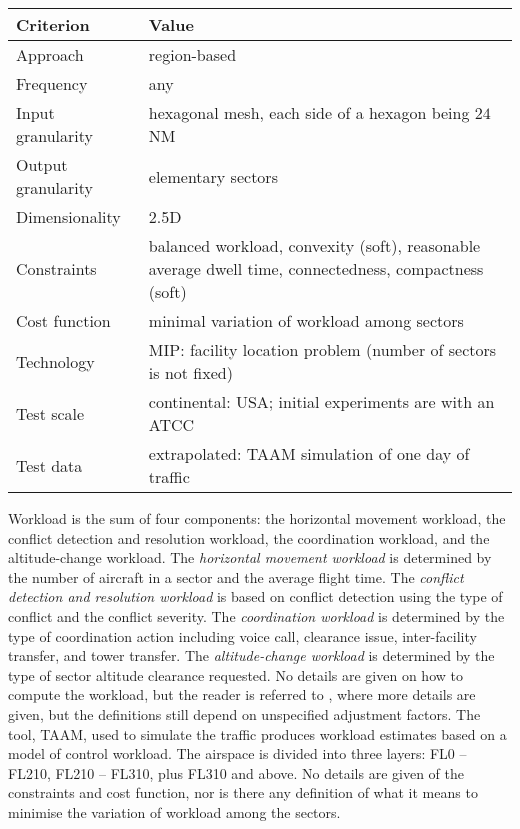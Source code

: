 \documentclass[a4paper,12pt]{article}
\begin{document}
\begin{center}
\begin{tabular}{|l|l|}
  \hline
  Criterion & Value \\
  \hline\hline
  Approach & region-based \\ \hline
  Frequency & any \\ \hline
  Input granularity & hexagonal mesh, each side of a hexagon
    being $24$ NM \\ \hline
  Output granularity & elementary sectors \\ \hline
  Dimensionality & 2.5D \\ \hline
  Constraints & \parbox{11.5cm}{balanced workload, convexity (soft),
    reasonable average dwell time, connectedness, compactness (soft)} \\ \hline
  Cost function & minimal variation of workload among sectors \\ \hline
  Technology & MIP: facility location problem (number of sectors is
    not fixed) \\ \hline
  Test scale & continental: USA; initial experiments are with an
    ATCC \\ \hline
  Test data & extrapolated: TAAM simulation of one day of traffic \\ \hline
\end{tabular}
\end{center}
Workload is the sum of four components: the horizontal movement
workload, the conflict detection and resolution workload, the
coordination workload, and the altitude-change workload.  The
\emph{horizontal movement workload} is determined by the number of
aircraft in a sector and the average flight time.  The \emph{conflict
  detection and resolution workload} is based on conflict detection
using the type of conflict and the conflict severity.  The
\emph{coordination workload} is determined by the type of coordination
action including voice call, clearance issue, inter-facility transfer,
and tower transfer.  The \emph{altitude-change workload} is determined
by the type of sector altitude clearance requested.  No details are
given on how to compute the workload, but the reader is referred to
\cite{Yousefi:ATM03}, where more details are given, but the
definitions still depend on unspecified adjustment factors.  The tool,
TAAM, used to simulate the traffic produces workload estimates based
on a model of control workload.  The airspace is divided into three
layers: FL0 -- FL210, FL210 -- FL310, plus FL310 and above.
No details are given of the constraints and cost function, nor is
there any definition of what it means to minimise the variation of
workload among the sectors.
\end{document}
